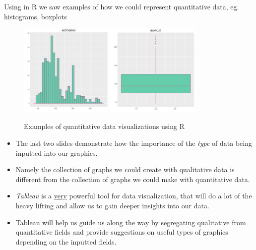 \documentclass[xcolor=svgnames]{beamer} %
\begin{document}
\begin{frame}
Using in R we saw examples of how we could represent quantitative data, eg. histograms, boxplots%
\begin{figure}[htbp]
\begin{center}
 \includegraphics[width=0.4\textwidth]{r4}  \includegraphics[width=0.4\textwidth]{r5}
\caption{Examples of quantitative data visualizations using R}
\label{default}
\end{center}
\end{figure}
\end{frame}

\begin{frame}{}
\begin{itemize}
\item The last two slides demonstrate how the importance of the \textit{type} of data being inputted into our graphics.
\vfill
\item Namely the collection of graphs we could create with qualitative data is different from the collection of graphs we could make with quantitative data.
\vfill
\item \emph{Tableau} is a \alert{\underline{very}} powerful tool for data visualization, that will do a lot of the heavy lifting  and allow us to gain deeper insights into our data. \vfill
\item Tableau will help us guide us along the way by segregating qualitative from quantitative fields and provide suggestions on useful types of graphics depending on the inputted fields.
\vfill 
\end{itemize}
\end{frame}
\end{document}
